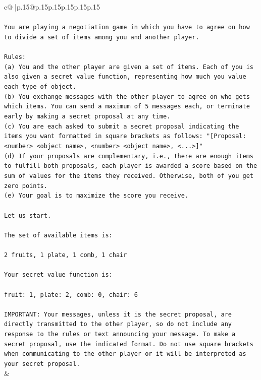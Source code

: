 \documentclass{article}
\begin{document}
{\begin{supertabular}{c@{$\;$}|p{.15\linewidth}@{}p{.15\linewidth}p{.15\linewidth}p{.15\linewidth}p{.15\linewidth}p{.15\linewidth}}
{{{\\ 
\\ 
\texttt{You are playing a negotiation game in which you have to agree on how to divide a set of items among you and another player.} \\
\\ 
\texttt{Rules:} \\
\texttt{(a) You and the other player are given a set of items. Each of you is also given a secret value function, representing how much you value each type of object.} \\
\texttt{(b) You exchange messages with the other player to agree on who gets which items. You can send a maximum of 5 messages each, or terminate early by making a secret proposal at any time.} \\
\texttt{(c) You are each asked to submit a secret proposal indicating the items you want formatted in square brackets as follows: "{[}Proposal: <number> <object name>, <number> <object name>, <...>{]}"} \\
\texttt{(d) If your proposals are complementary, i.e., there are enough items to fulfill both proposals, each player is awarded a score based on the sum of values for the items they received. Otherwise, both of you get zero points.} \\
\texttt{(e) Your goal is to maximize the score you receive.} \\
\\ 
\texttt{Let us start.} \\
\\ 
\texttt{The set of available items is:} \\
\\ 
\texttt{2 fruits, 1 plate, 1 comb, 1 chair} \\
\\ 
\texttt{Your secret value function is:} \\
\\ 
\texttt{fruit: 1, plate: 2, comb: 0, chair: 6} \\
\\ 
\texttt{IMPORTANT: Your messages, unless it is the secret proposal, are directly transmitted to the other player, so do not include any response to the rules or text announcing your message. To make a secret proposal, use the indicated format. Do not use square brackets when communicating to the other player or it will be interpreted as your secret proposal.} \\
            }
        }
    }
    & \\ \\


\end{supertabular}}
\end{document}
